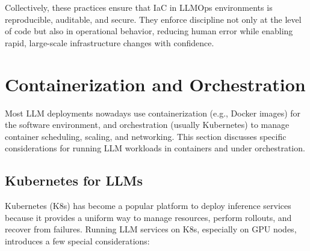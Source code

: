 Collectively, these practices ensure that IaC in LLMOps environments is reproducible, auditable, and secure. They enforce discipline not only at the level of code but also in operational behavior, reducing human error while enabling rapid, large-scale infrastructure changes with confidence.


\section{Containerization and Orchestration}
\label{sec:orchestration}

Most LLM deployments nowadays use containerization (e.g., Docker images) for the software environment, and orchestration (usually Kubernetes) to manage container scheduling, scaling, and networking. This section discusses specific considerations for running LLM workloads in containers and under orchestration.

\subsection{Kubernetes for LLMs}
\label{sec:orchestration-k8s}

Kubernetes (K8s) has become a popular platform to deploy inference services because it provides a uniform way to manage resources, perform rollouts, and recover from failures. Running LLM services on K8s, especially on GPU nodes, introduces a few special considerations:

